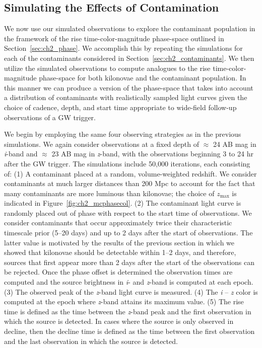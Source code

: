 \subsection{Simulating the Effects of Contamination}
\label{sec:ch2_MCsims_cont}

We now use our simulated observations to explore the contaminant population in the framework of the rise time-color-magnitude phase-space outlined in Section~\ref{sec:ch2_phase}. We accomplish this by repeating the simulations for each of the contaminants considered in Section~\ref{sec:ch2_contaminants}. We then utilize the simulated observations to compute analogues to the rise time-color-magnitude phase-space for both kilonovae and the contaminant population. In this manner we can produce a version of the phase-space that takes into account a distribution of contaminants with realistically sampled light curves given the choice of cadence, depth, and start time appropriate to wide-field follow-up observations of a GW trigger.

We begin by employing the same four observing strategies as in the previous simulations. We again consider observations at a fixed depth of $\approx$ 24 AB mag in {\em i}-band and $\approx$ 23 AB mag in {\em z}-band, with the observations beginning 3 to 24 hr after the GW trigger. The simulations include 50,000 iterations, each consisting of: (1) A contaminant placed at a random, volume-weighted redshift. We consider contaminants at much larger distances than 200 Mpc to account for the fact that many contaminants are more luminous than kilonovae; the choice of $z_{\text{max}}$ is indicated in Figure~\ref{fig:ch2_mcphasecol}. (2) The contaminant light curve is randomly placed out of phase with respect to the start time of observations. We consider contaminants that occur approximately twice their characteristic timescale prior (5--20 days) and up to 2 days after the start of observations. The latter value is motivated by the results of the previous section in which we showed that kilonovae should be detectable within 1--2 days, and therefore, sources that first appear more than 2 days after the start of the observations can be rejected. Once the phase offset is determined the observation times are computed and the source brightness in {\em i}- and {\em z}-band is computed at each epoch. (3) The observed peak of the {\em z}-band light curve is measured. (4) The {\em i} -- {\em z} color is computed at the epoch where {\em z}-band attains its maximum value. (5) The rise time is defined as the time between the {\em z}-band peak and the first observation in which the source is detected. In cases where the source is only observed in decline, then the decline time is defined as the time between the first observation and the last observation in which the source is detected.

